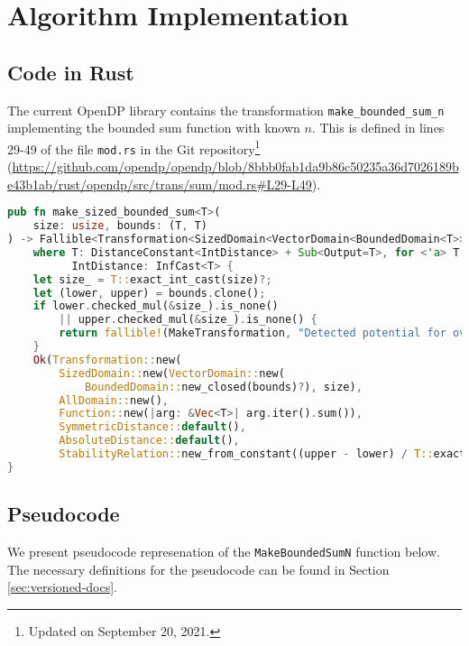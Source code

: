 \documentclass[11pt,a4paper]{article}
\theoremstyle{definition}
\begin{document}
\section{Algorithm Implementation}
\subsection{Code in Rust}
The current OpenDP library contains the transformation \texttt{make\_bounded\_sum\_n} implementing the bounded sum function with known $n$. This is defined in lines 29-49 of the file \texttt{mod.rs} in the Git repository\footnote{Updated on September 20, 2021.} (\url{https://github.com/opendp/opendp/blob/8bbb0fab1da9b86c50235a36d7026189be43b1ab/rust/opendp/src/trans/sum/mod.rs#L29-L49}).


\begin{lstlisting}[language = Rust]
pub fn make_sized_bounded_sum<T>(
    size: usize, bounds: (T, T)
) -> Fallible<Transformation<SizedDomain<VectorDomain<BoundedDomain<T>>>, AllDomain<T>, SymmetricDistance, AbsoluteDistance<T>>>
    where T: DistanceConstant<IntDistance> + Sub<Output=T>, for <'a> T: Sum<&'a T> + ExactIntCast<usize> + CheckedMul + CheckNull,
          IntDistance: InfCast<T> {
    let size_ = T::exact_int_cast(size)?;
    let (lower, upper) = bounds.clone();
    if lower.checked_mul(&size_).is_none()
        || upper.checked_mul(&size_).is_none() {
        return fallible!(MakeTransformation, "Detected potential for overflow when computing function.")
    }
    Ok(Transformation::new(
        SizedDomain::new(VectorDomain::new(
            BoundedDomain::new_closed(bounds)?), size),
        AllDomain::new(),
        Function::new(|arg: &Vec<T>| arg.iter().sum()),
        SymmetricDistance::default(),
        AbsoluteDistance::default(),
        StabilityRelation::new_from_constant((upper - lower) / T::exact_int_cast(2)?)))
}
\end{lstlisting}

\subsection{Pseudocode}
\label{sec:pseudocode}
We present pseudocode represenation of the \texttt{MakeBoundedSumN} function below. The necessary definitions for the pseudocode can be found in Section \ref{sec:versioned-docs}.
\end{document}
